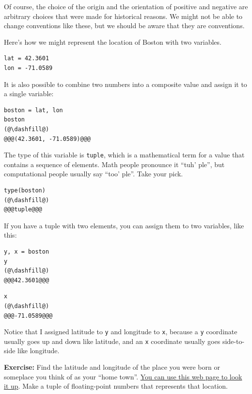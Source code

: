 Of course, the choice of the origin and the orientation of positive and
negative are arbitrary choices that were made for historical reasons. We
might not be able to change conventions like these, but we should be
aware that they are conventions.

Here's how we might represent the location of Boston with two variables.

\begin{lstlisting}[]
lat = 42.3601
lon = -71.0589
\end{lstlisting}

It is also possible to combine two numbers into a composite value and
assign it to a single variable:

\begin{lstlisting}[]
boston = lat, lon
boston
(@\dashfill@)
@@@(42.3601, -71.0589)@@@
\end{lstlisting}

The type of this variable is \passthrough{\lstinline!tuple!}, which is a
mathematical term for a value that contains a sequence of elements. Math
people pronounce it ``tuh' ple'', but computational people usually say
``too' ple''. Take your pick.

\begin{lstlisting}[]
type(boston)
(@\dashfill@)
@@@tuple@@@
\end{lstlisting}

If you have a tuple with two elements, you can assign them to two
variables, like this:

\begin{lstlisting}[]
y, x = boston
y
(@\dashfill@)
@@@42.3601@@@
\end{lstlisting}

\begin{lstlisting}[]
x
(@\dashfill@)
@@@-71.0589@@@
\end{lstlisting}

Notice that I assigned latitude to \passthrough{\lstinline!y!} and
longitude to \passthrough{\lstinline!x!}, because a
\passthrough{\lstinline!y!} coordinate usually goes up and down like
latitude, and an \passthrough{\lstinline!x!} coordinate usually goes
side-to-side like longitude.

\textbf{Exercise:} Find the latitude and longitude of the place you were
born or someplace you think of as your ``home town''.
\href{https://www.latlong.net/}{You can use this web page to look it
up}. Make a tuple of floating-point numbers that represents that
location.

